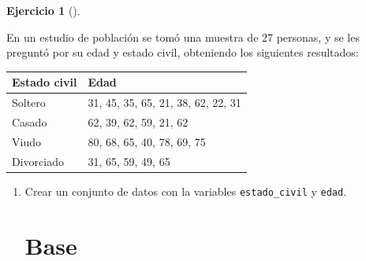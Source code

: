\documentclass[
  spanish,
  a4paper,
]{scrreport}
\theoremstyle{definition}
\newtheorem{exercise}{Ejercicio}[chapter]
\theoremstyle{remark}
\begin{document}
\begin{exercise}[]\protect\hypertarget{exr-frecuencias-graficos-estado-civil-edades}{}\label{exr-frecuencias-graficos-estado-civil-edades}

En un estudio de población se tomó una muestra de 27 personas, y se les
preguntó por su edad y estado civil, obteniendo los siguientes
resultados:

\begin{longtable}[]{@{}ll@{}}
\toprule\noalign{}
Estado civil & Edad \\
\midrule\noalign{}
\endhead
\bottomrule\noalign{}
\endlastfoot
Soltero & 31, 45, 35, 65, 21, 38, 62, 22, 31 \\
Casado & 62, 39, 62, 59, 21, 62 \\
Viudo & 80, 68, 65, 40, 78, 69, 75 \\
Divorciado & 31, 65, 59, 49, 65 \\
\end{longtable}

\begin{enumerate}
\def\labelenumi{\alph{enumi}.}
\item
  Crear un conjunto de datos con la variables \texttt{estado\_civil} y
  \texttt{edad}.

  \begin{tcolorbox}[enhanced jigsaw, titlerule=0mm, arc=.35mm, rightrule=.15mm, opacitybacktitle=0.6, leftrule=.75mm, colframe=quarto-callout-tip-color-frame, toptitle=1mm, breakable, colbacktitle=quarto-callout-tip-color!10!white, bottomrule=.15mm, colback=white, left=2mm, bottomtitle=1mm, opacityback=0, title=\textcolor{quarto-callout-tip-color}{\faLightbulb}\hspace{0.5em}{Solución}, toprule=.15mm, coltitle=black]

  \section{Base}


\end{tcolorbox}
\end{enumerate}
\end{exercise}
\end{document}
